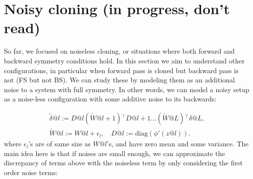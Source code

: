\documentclass{article}
\newcommand{\1}{\mathbf{1}}
\newcommand{\Loss}{\mathcal{L}}
\newcommand{\R}[2]{\mathcal{R}_{#2}(#1)}
\renewcommand{\R}[2]{({#1})^{\oplus #2}}
\newcommand{\bl}[2]{\mathcal{B}_{#2}({#1})}
\newcommand{\B}[1]{\boldsymbol{#1}}
\newcommand{\T}{\ensuremath{{}^{\top}}}
\begin{document}
\section{Noisy cloning (in progress, don't read)}
So far, we focused on noiseless cloning, or situations where both forward and backward symmetry conditions hold. In this section we aim to understand other configurations, in particular when forward pass is cloned but backward pass is not (FS but not BS). We can study these by modeling them as an additional noise to a system with full symmetry. In other words, we can model a noisy setup as a noise-less configuration with some additive noise to its backwards:


\begin{align*}
    \tilde\delta@l:=D@l (\tilde W@{l+1})\T D@{l+1} \dots (\tilde W@L)\T \delta@L, \\
    \tilde W@l:= W@l+\epsilon_l,\quad D@l:=\text{diag}(\phi'(z@l)).
\end{align*}
where $\epsilon_l$'s are of same size as $W@ l$'s, and have zero mean and some variance.  The main idea here is that if noises are small enough, we can approximate the discrepancy of terms above with the noiseless term by only considering the first order noise terms:
\end{document}
